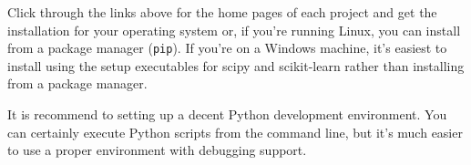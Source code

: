 \documentclass[11pt]{article} %
\begin{document}

Click through the links above for the home pages of each project and get the installation for your operating system or, if you're running Linux, you can install from a package manager (\texttt{pip}). If you're on a Windows machine, it's easiest to install using the setup executables for scipy and scikit-learn rather than installing from a package manager.

It is recommend to setting up a decent Python development environment. You can certainly execute Python scripts from the command line, but it's much easier to use a proper environment with debugging support.




\newpage

\newpage








\newpage
%
\end{document}
